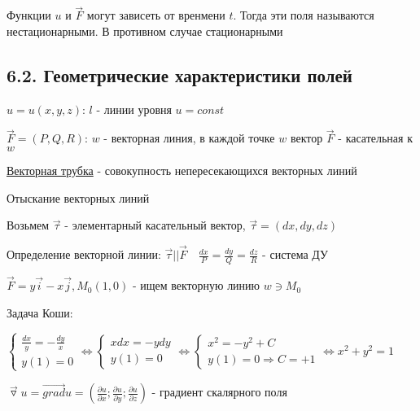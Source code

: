 \documentclass[12pt]{article}
\begin{document}
    \Nota Функции $u$ и $\overrightarrow{F}$ могут зависеть от вренмени $t$. Тогда эти поля называются нестационарными. В противном случае стационарными

    \hypertarget{scalarandvectorfieldgeometric}{}

    \subsection{6.2. Геометрические характеристики полей}

    $u = u(x, y, z)$: $l$ - линии уровня $u = const$

    $\overrightarrow{F} = (P, Q, R)$: $w$ - векторная линия, в каждой точке $w$ вектор $\overrightarrow{F}$ - касательная к $w$

    \underline{Векторная трубка} - совокупность непересекающихся векторных линий

    \Nota Отыскание векторных линий

    Возьмем $\overrightarrow{\tau}$ - элементарный касательный вектор, $\overrightarrow{\tau} = (dx, dy, dz)$

    Определение векторной линии: $\overrightarrow{\tau} || \overrightarrow{F} \quad \frac{dx}{P} = \frac{dy}{Q} = \frac{dz}{R}$ - система ДУ

    \Ex $\overrightarrow{F} = y \overrightarrow{i} - x \overrightarrow{j}, M_0 (1, 0)$ - ищем векторную линию $w \ni M_0$

    Задача Коши:

    $\begin{cases}
         \frac{dx}{y} = -\frac{dy}{x} \\
         y(1) = 0
    \end{cases} \Longleftrightarrow \begin{cases}
                                        xdx = -ydy \\
                                        y(1) = 0
    \end{cases} \Longleftrightarrow \begin{cases}
                                        x^2 = -y^2 + C \\
                                        y(1) = 0 \Longrightarrow C = +1
    \end{cases} \Longleftrightarrow x^2 + y^2 = 1 $

    \hypertarget{differentialcharacteristics}{}


    \Mems $\overrightarrow{\triangledown}u = \overrightarrow{grad}u = \left(\frac{\partial u}{\partial x}; \frac{\partial u}{\partial y}; \frac{\partial u}{\partial z}\right)$ - градиент скалярного поля
\end{document}

